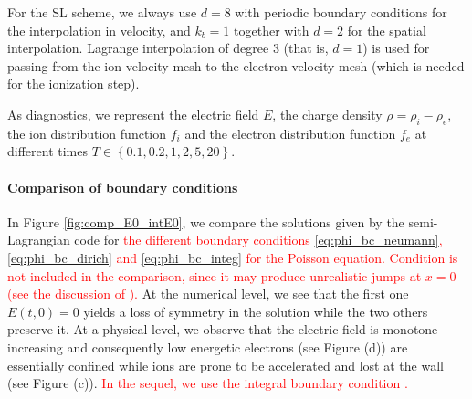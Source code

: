 \documentclass{article}
\numberwithin{equation}{section}
\begin{document}



For the SL scheme, we always use $d=8$ with periodic boundary conditions for the interpolation in velocity, and $k_b=1$ together with $d=2$ for the spatial interpolation.
Lagrange interpolation of degree $3$  (that is, $d=1$) is used for passing from the ion velocity mesh to the electron velocity mesh (which is needed for the ionization step).

As diagnostics, we represent the electric field $E$, the charge density $\rho=\rho_i-\rho_e$, the ion distribution function $f_i$ and the electron distribution function $f_e$ at different times $T\in \left\{0.1,0.2,1,2,5,20\right\}$.

\paragraph{Comparison of boundary conditions}

In Figure \ref{fig:comp_E0_intE0}, we compare the solutions given by the semi-Lagrangian code for \textcolor{red}{the different boundary conditions \eqref{eq:phi_bc_neumann}, \eqref{eq:phi_bc_dirich} and \eqref{eq:phi_bc_integ} for the Poisson equation. Condition  is not included in the comparison, since it may produce unrealistic jumps at $x=0$ (see the discussion of ).}
At the numerical level, we see that the first one $E(t,0) = 0$ yields a loss of symmetry in the solution while the two others preserve it. At a physical level, we observe that the electric field is monotone increasing  and consequently low energetic electrons (see Figure (d)) are essentially confined while ions are prone to be accelerated and lost at the wall (see Figure (c)). \textcolor{red}{In the sequel, we use the integral boundary condition .}
\end{document}
